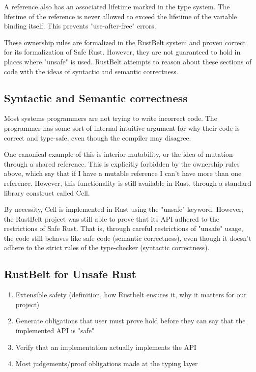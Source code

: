 \documentclass[12pt]{article}
\begin{document}
A reference also has an associated lifetime marked in the type system. The lifetime of the reference is never allowed to exceed the lifetime of the variable binding itself. This prevents "use-after-free" errors.

These ownership rules are formalized in the RustBelt system and proven correct for its formalization of Safe Rust. However, they are not guaranteed to hold in places where "unsafe" is used. RustBelt attempts to reason about these sections of code with the ideas of syntactic and semantic correctness.

\subsection{Syntactic and Semantic correctness}
Most systems programmers are not trying to write incorrect code. The programmer has some sort of internal intuitive argument for why their code is correct and type-safe, even though the compiler may disagree.

One canonical example of this is interior mutability, or the idea of mutation through a shared reference. This is explicitly forbidden by the ownership rules above, which say that if I have a mutable reference I can't have more than one reference. However, this functionality is still available in Rust, through a standard library construct called Cell.

By necessity, Cell is implemented in Rust using the "unsafe" keyword. However, the RustBelt project was still able to prove that its API adhered to the restrictions of Safe Rust. That is, through careful restrictions of "unsafe" usage, the code still behaves like safe code (semantic correctness), even though it doesn't adhere to the strict rules of the type-checker (syntactic correctness).

\subsection{RustBelt for Unsafe Rust}

\begin{enumerate}
    \item Extensible safety (definition, how Rustbelt ensures it, why it matters for our project)
    \item Generate obligations that user must prove hold before they can say that the implemented API is "safe"
    \item Verify that an implementation actually implements the API
    \item Most judgements/proof obligations made at the typing layer
\end{enumerate}
\end{document}
